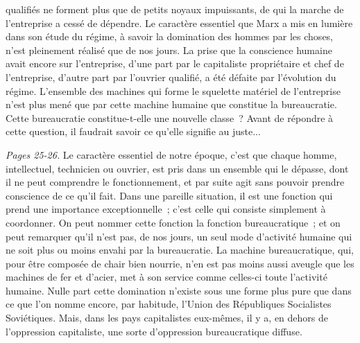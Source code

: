 \documentclass[french,twoside]{book} %
\begin{document}
qualifiés ne forment plus que de petits noyaux impuissants, de qui la marche de l'entreprise a cessé de dépendre. Le caractère essentiel que Marx a mis en lumière dans son étude du régime, à savoir la domination des hommes par les choses, n'est pleinement réalisé que de nos jours. La prise que la conscience humaine avait encore sur l'entreprise, d'une part par le capitaliste propriétaire et chef de l'entreprise, d'autre part par l'ouvrier qualifié, a été défaite par l'évolution du régime. L'ensemble des machines qui forme le squelette matériel de l'entreprise n'est plus mené que par cette machine humaine que constitue la bureaucratie. Cette bureaucratie constitue-t-elle une nouvelle classe ? Avant de répondre à cette question, il faudrait savoir ce qu'elle signifie au juste...\par
{\itshape Pages 25-26.} Le caractère essentiel de notre époque, c'est que chaque homme, intellectuel, technicien ou ouvrier, est pris dans un ensemble qui le dépasse, dont il ne peut comprendre le fonctionnement, et par suite agit sans pouvoir prendre conscience de ce qu'il fait. Dans une pareille situation, il est une fonction qui prend une importance exceptionnelle ; c'est celle qui consiste simplement à coordonner. On peut nommer cette fonction la fonction bureaucratique ; et on peut remarquer qu'il n'est pas, de nos jours, un seul mode d'activité humaine qui ne soit plus ou moins envahi par la bureaucratie. La machine bureaucratique, qui, pour être composée de chair bien nourrie, n'en est pas moins aussi aveugle que les machines de fer et d'acier, met à son service comme celles-ci toute l'activité humaine. Nulle part cette domination n'existe sous une forme plus pure que dans ce que l'on nomme encore, par habitude, l'Union des Républiques Socialistes Soviétiques. Mais, dans les pays capitalistes eux-mêmes, il y a, en dehors de l'oppression capitaliste, une sorte d'oppression bureaucratique diffuse.\par
\end{document}
